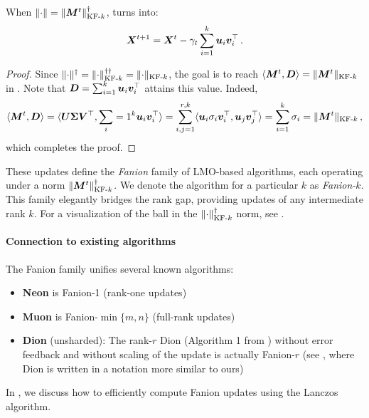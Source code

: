 \documentclass[pmlr]{jmlr}%
\newcommand{\norm}[1]{\lVert #1\rVert}
\DeclarePairedDelimiter{\normkfk}{\|}{\|_{\text{KF-}k}}
\def\<#1,#2>{\langle #1,#2\rangle}
\begin{document}
 \begin{lemma}\label{lemma:ky_fan_update}
   When $\norm{\cdot} = \normkfk{\mM^t}^\dagger$,  turns into:
   \begin{equation}\label{eq:ky_fan_update}
     {\bm{X}}^{t+1} = {\bm{X}}^{t} - \gamma_t \sum_{i=1}^{k}{\bm{u}}_i {\bm{v}}_i^\top\,.
   \end{equation}
 \end{lemma}
 
 \begin{proof}
 Since $\norm{\cdot}^\dagger = \normkfk{\cdot}^{\dagger\dagger} = \normkfk{\cdot}$, the goal is to reach $\<\mM^t, \mD> = \normkfk{\mM^t}$ in . Note that ${\bm{D}} = \sum_{i=1}^{k} {\bm{u}}_i {\bm{v}}_i^\top$ attains this value. Indeed,
 \[
 \<\mM^t, \mD> =\<\mU \mSigma \mV^\top, \sum_{i=1}^{k} \vu_i \vv_i^\top> = \sum_{i,j=1}^{r, k}\<\vu_i \sigma_i \vv_i^\top, \vu_j \vv_j^\top> = \sum_{i=1}^{k}\sigma_i = \normkfk{\mM^t}\,,
 \]
 which completes the proof.
 \end{proof}
 
 These updates define the \emph{Fanion} family of LMO-based algorithms, each operating under a norm $\normkfk{\mM^t}^\dagger$. We denote the algorithm for a particular $k$ as \emph{Fanion-$k$}. This family elegantly bridges the rank gap, providing updates of any intermediate rank $k$. For a visualization of the ball in the $\normkfk{\cdot}^\dagger$ norm, see .
 
 \paragraph{Connection to existing algorithms}
 The Fanion family unifies several known algorithms:
 \begin{itemize}
   \item \textbf{Neon} is Fanion-1 (rank-one updates)
   \item \textbf{Muon} is Fanion-$\min\{m,n\}$ (full-rank updates)
   \item \textbf{Dion} (unsharded): The rank-$r$ Dion (Algorithm 1 from \citep{ahn2025dion}) without error feedback and without scaling of the update is actually Fanion-$r$ (see \citep{pethick2025understandingdion}, where Dion is written in a notation more similar to ours)
 \end{itemize}
 
 In , we discuss how to efficiently compute Fanion updates using the Lanczos algorithm.
 
\end{document}
